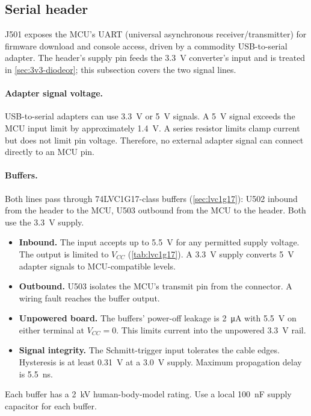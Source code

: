 \subsection{Serial header}
\label{sec:esp32-uart}

J501 exposes the MCU's UART (universal asynchronous receiver/transmitter) for
firmware download and console access, driven by a commodity USB-to-serial
adapter. The header's supply pin feeds the 3.3~V converter's input and is
treated in \cref{sec:3v3-diodeor}; this subsection covers the two signal
lines.

\paragraph{Adapter signal voltage.} USB-to-serial adapters can use 3.3~V or 5~V
signals. A 5~V signal exceeds the MCU input limit by approximately
\SI{1.4}{\volt}. A series resistor limits clamp current but does not limit pin
voltage. Therefore, no external adapter signal can connect directly to an MCU
pin.

\paragraph{Buffers.} Both lines pass through 74LVC1G17-class buffers
(\cref{sec:lvc1g17}): U502 inbound from the header to the MCU, U503 outbound
from the MCU to the header. Both use the 3.3~V supply.
\begin{itemize}[nosep]
  \item \textbf{Inbound.} The input accepts up to \SI{5.5}{\volt} for any
    permitted supply voltage. The output is limited to $V_{CC}$
    (\cref{tab:lvc1g17}). A \SI{3.3}{\volt} supply converts 5~V adapter signals
    to MCU-compatible levels.
  \item \textbf{Outbound.} U503 isolates the MCU's transmit pin from the
    connector. A wiring fault reaches the buffer output.
  \item \textbf{Unpowered board.} The buffers' power-off leakage is
    \SI{2}{\micro\ampere} with \SI{5.5}{\volt} on either terminal at
    \(V_{CC}=0\). This limits current into the unpowered 3.3~V rail.
  \item \textbf{Signal integrity.} The Schmitt-trigger input tolerates the
    cable edges. Hysteresis is at least \SI{0.31}{\volt} at a
    \SI{3.0}{\volt} supply. Maximum propagation delay is
    \SI{5.5}{\nano\second}.
\end{itemize}
Each buffer has a \SI{2}{\kilo\volt} human-body-model rating. Use a local
\SI{100}{\nano\farad} supply capacitor for each buffer.

